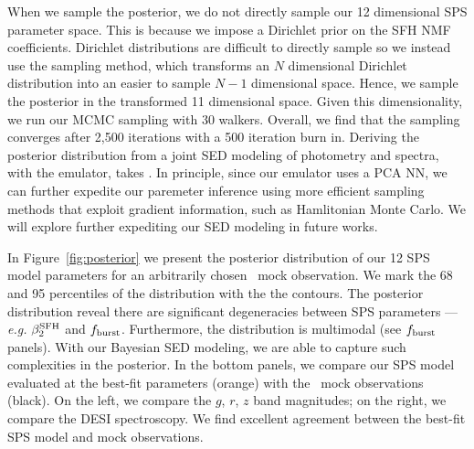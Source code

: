 When we sample the posterior, we do not directly sample our 12 dimensional
SPS parameter space. 
This is because we impose a Dirichlet prior on the SFH NMF coefficients. 
Dirichlet distributions are difficult to directly sample so we instead use the
\cite{betancourt2012} sampling method, which transforms an $N$ dimensional
Dirichlet distribution into an easier to sample $N-1$ dimensional space.
Hence, we sample the posterior in the transformed 11 dimensional space. 
Given this dimensionality, we run our MCMC sampling with 30 walkers.
Overall, we find that the sampling converges after 2,500 iterations with a 500
iteration burn in. 
Deriving the posterior distribution from a joint SED modeling of photometry and
spectra, with the emulator, takes . 
In principle, since our emulator uses a PCA NN, we can further expedite our
paremeter inference using more efficient sampling methods that exploit gradient
information, such as Hamlitonian Monte Carlo.  
We will explore further expediting our SED modeling in future works. 

In Figure~\ref{fig:posterior} we present the posterior distribution of our 12
SPS model parameters for an arbitrarily chosen \lgal~mock observation. 
We mark the 68 and 95 percentiles of the distribution with the the contours. 
The posterior distribution reveal there are significant degeneracies between
SPS parameters --- \emph{e.g.} $\beta_2^{\rm SFH}$ and $f_{\rm burst}$. 
Furthermore, the distribution is multimodal (see $f_{\rm burst}$ panels). 
With our Bayesian SED modeling, we are able to capture such complexities in the
posterior.
In the bottom panels, we compare our SPS model evaluated at the best-fit
parameters (orange) with the \lgal~mock observations (black). 
On the left, we compare the $g$, $r$, $z$ band magnitudes; on the right, we
compare the DESI spectroscopy. 
We find excellent agreement between the best-fit SPS model and mock
observations.
